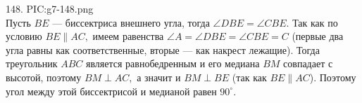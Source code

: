 148. {{PIC:g7-148.png}}\\
Пусть $BE$ --- биссектриса внешнего угла, тогда $\angle DBE=\angle CBE.$ Так как по условию $BE\parallel AC,$ имеем равенства $\angle A=\angle DBE=\angle CBE=C$ (первые два угла равны как соответственные, вторые --- как накрест лежащие). Тогда треугольник $ABC$ является равнобедренным и его медиана $BM$ совпадает с высотой, поэтому $BM\perp AC,$ а значит и $BM\perp BE$ (так как $BE\parallel AC$). Поэтому угол между этой биссектрисой и медианой равен $90^\circ.$\newpage\noindent
